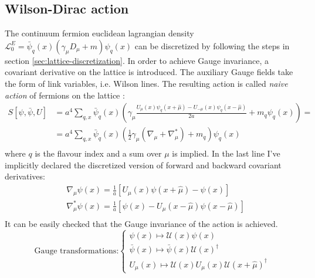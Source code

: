 \documentclass[english, LaM, oneside, noexaminfo]{sapthesis}
\begin{document}
\subsection{Wilson-Dirac action}\label{subsec:naive-wd-action}
\noindent
The continuum fermion euclidean lagrangian density $\mathcal{L}_0^E = \bar \psi_q (x) \left( \gamma_\mu D_\mu + m \right) \psi_q (x)$ can be discretized by following the steps in section \ref{sec:lattice-discretization}.
In order to achieve Gauge invariance, a covariant derivative on the lattice is introduced.
The auxiliary Gauge fields take the form of link variables, i.e. Wilson lines.
The resulting action is called \textit{naive action} of fermions on the lattice \cite{montvay-munster}\cite{gattringer-lang}:
\begin{equation*}
    \begin{aligned}
        S [\psi,\bar \psi, U]
        & = a^4\sum_{q,x} \bar \psi_q (x) \left( \gamma_\mu \frac{U_\mu (x) \psi_q (x+\hat\mu) - U_{-\mu}(x)\psi_q(x-\hat\mu)}{2a} + m_q \psi_q (x) \right) = \\
        & = a^4\sum_{q,x} \bar \psi_q (x) \left( \frac{1}{2}\gamma_\mu (\nabla_\mu + \nabla^*_\mu) + m_q \right) \psi_q (x)  \\
    \end{aligned} 
\end{equation*}
where $q$ is the flavour index and a sum over $\mu$ is implied.
In the last line I've implicitly declared the discretized version of forward and backward covariant derivatives:
\begin{equation*}
    \begin{aligned}
        & \nabla_\mu \psi (x) = \frac{1}{a}\left[U_\mu (x) \psi (x+\hat\mu)-\psi (x)\right] \\
        & \nabla^*_\mu \psi (x) = \frac{1}{a}\left[\psi (x) - U_\mu (x-\hat\mu) \psi (x-\hat\mu)\right] \\
    \end{aligned}
\end{equation*}
It can be easily checked that the Gauge invariance of the action is achieved.
\begin{equation*}
    \text{Gauge transformations:} 
    \begin{cases}
        \psi (x) \mapsto \mathcal{U}(x) \psi (x) \\
        \bar\psi (x) \mapsto \bar\psi (x) \mathcal{U}(x)^\dagger \\
        U_\mu (x) \mapsto \mathcal{U} (x) U_\mu (x) \mathcal{U} (x+\hat\mu)^\dagger
    \end{cases}
\end{equation*}
\end{document}
